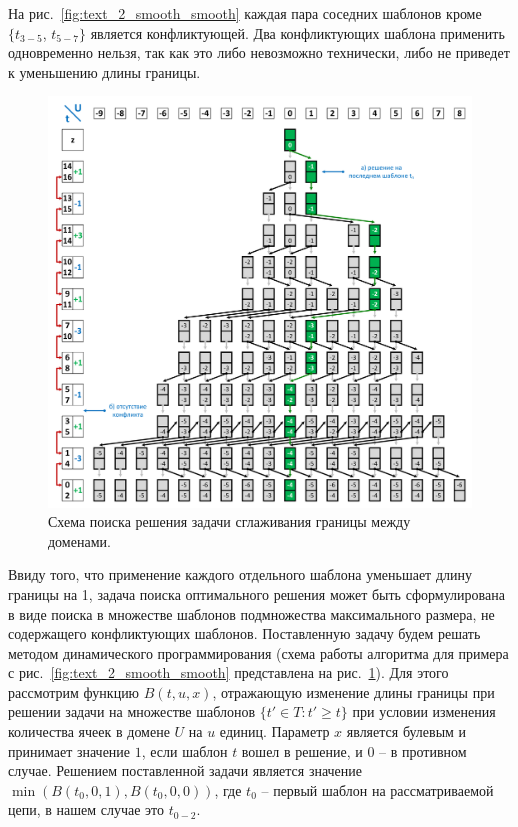 На рис.~\ref{fig:text_2_smooth_smooth} каждая пара соседних шаблонов кроме $\{ t_{3-5}$, $t_{5-7} \}$ является конфликтующей.
Два конфликтующих шаблона применить одновременно нельзя, так как это либо невозможно технически, либо не приведет к уменьшению длины границы.

\begin{figure}[!ht]
\centering
\includegraphics[width=1.0\textwidth]{fig/par_smooth-scheme-cut.pdf}
\singlespacing
{}\caption{Схема поиска решения задачи сглаживания границы между доменами.}
\label{fig:text_2_smooth_smooth_scheme}
\end{figure}

Ввиду того, что применение каждого отдельного шаблона уменьшает длину границы на 1, задача поиска оптимального решения может быть сформулирована в виде поиска в множестве шаблонов подмножества максимального размера, не содержащего конфликтующих шаблонов.
Поставленную задачу будем решать методом динамического программирования (схема работы алгоритма для примера с рис.~\ref{fig:text_2_smooth_smooth} представлена на рис.~\ref{fig:text_2_smooth_smooth_scheme}).
Для этого рассмотрим функцию $B(t, u, x)$, отражающую изменение длины границы при решении задачи на множестве шаблонов $\{ t' \in T : t' \ge t \}$ при условии изменения количества ячеек в домене $U$ на $u$ единиц.
Параметр $x$ является булевым и принимает значение $1$, если шаблон $t$ вошел в решение, и $0$ -- в противном случае.
Решением поставленной задачи является значение $\min(B(t_0, 0, 1), B(t_0, 0, 0))$, где $t_0$ -- первый шаблон на рассматриваемой цепи, в нашем случае это $t_{0-2}$.

